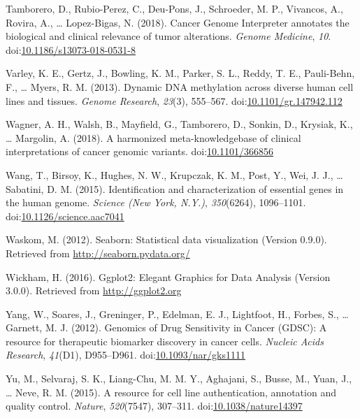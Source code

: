 \documentclass[man]{apa6}
\begin{document}
\hypertarget{ref-tamborero2018}{}
Tamborero, D., Rubio-Perez, C., Deu-Pons, J., Schroeder, M. P.,
Vivancos, A., Rovira, A., \ldots{} Lopez-Bigas, N. (2018). Cancer Genome
Interpreter annotates the biological and clinical relevance of tumor
alterations. \emph{Genome Medicine}, \emph{10}.
doi:\href{https://doi.org/10.1186/s13073-018-0531-8}{10.1186/s13073-018-0531-8}

\hypertarget{ref-varley2013}{}
Varley, K. E., Gertz, J., Bowling, K. M., Parker, S. L., Reddy, T. E.,
Pauli-Behn, F., \ldots{} Myers, R. M. (2013). Dynamic DNA methylation
across diverse human cell lines and tissues. \emph{Genome Research},
\emph{23}(3), 555--567.
doi:\href{https://doi.org/10.1101/gr.147942.112}{10.1101/gr.147942.112}

\hypertarget{ref-wagner2018}{}
Wagner, A. H., Walsh, B., Mayfield, G., Tamborero, D., Sonkin, D.,
Krysiak, K., \ldots{} Margolin, A. (2018). A harmonized
meta-knowledgebase of clinical interpretations of cancer genomic
variants. doi:\href{https://doi.org/10.1101/366856}{10.1101/366856}

\hypertarget{ref-wang2015a}{}
Wang, T., Birsoy, K., Hughes, N. W., Krupczak, K. M., Post, Y., Wei, J.
J., \ldots{} Sabatini, D. M. (2015). Identification and characterization
of essential genes in the human genome. \emph{Science (New York, N.Y.)},
\emph{350}(6264), 1096--1101.
doi:\href{https://doi.org/10.1126/science.aac7041}{10.1126/science.aac7041}

\hypertarget{ref-waskom2012}{}
Waskom, M. (2012). Seaborn: Statistical data visualization (Version
0.9.0). Retrieved from \url{http://seaborn.pydata.org/}

\hypertarget{ref-wickham2016}{}
Wickham, H. (2016). Ggplot2: Elegant Graphics for Data Analysis (Version
3.0.0). Retrieved from \url{http://ggplot2.org}

\hypertarget{ref-yang2012}{}
Yang, W., Soares, J., Greninger, P., Edelman, E. J., Lightfoot, H.,
Forbes, S., \ldots{} Garnett, M. J. (2012). Genomics of Drug Sensitivity
in Cancer (GDSC): A resource for therapeutic biomarker discovery in
cancer cells. \emph{Nucleic Acids Research}, \emph{41}(D1), D955--D961.
doi:\href{https://doi.org/10.1093/nar/gks1111}{10.1093/nar/gks1111}

\hypertarget{ref-yu2015}{}
Yu, M., Selvaraj, S. K., Liang-Chu, M. M. Y., Aghajani, S., Busse, M.,
Yuan, J., \ldots{} Neve, R. M. (2015). A resource for cell line
authentication, annotation and quality control. \emph{Nature},
\emph{520}(7547), 307--311.
doi:\href{https://doi.org/10.1038/nature14397}{10.1038/nature14397}

\endgroup
\end{document}
